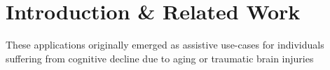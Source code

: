 \section{Introduction \& Related Work}\label{sec:intro}

These applications originally emerged as assistive use-cases for individuals suffering from cognitive decline due to aging or traumatic brain injuries~\cite{Ha2014towards,Satya2019augmenting}